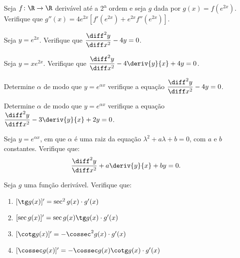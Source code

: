 \begin{exercicio}[9]
Seja $f\colon \R \to \R$ derivável até a 2\textsuperscript{a} ordem e seja $g$ dada por $g(x) = f(e^{2x})$. Verifique que $g''(x) = 4e^{2x}[f'(e^{2x}) + e^{2x}f''(e^{2x})]$.
\end{exercicio}

\begin{exercicio}[10]
Seja $y = e^{2x}$. Verifique que $\dfrac{\diff^2 y}{\diff x^2} - 4y = 0$.
\end{exercicio}

\begin{exercicio}[11]
Seja $y = xe^{2x}$. Verifique que $\dfrac{\diff^2 y}{\diff x^2} - 4\deriv{y}{x} + 4y = 0$.
\end{exercicio}

\begin{exercicio}[12]
Determine $\alpha$ de modo que $y = e^{\alpha x}$ verifique a equação $\dfrac{\diff^2 y}{\diff x^2} - 4y = 0$.
\end{exercicio}

\begin{exercicio}[13]
Determine $\alpha$ de modo que $y = e^{\alpha x}$ verifique a equação $\dfrac{\diff^2 y}{\diff x^2} - 3\deriv{y}{x} + 2y = 0$.
\end{exercicio}

\begin{exercicio}[14]
Seja $y = e^{\alpha x}$, em que $\alpha$ é uma raiz da equação $\lambda^2 + a\lambda + b = 0$, com $a$ e $b$ constantes. Verifique que:
\[
\frac{\diff^2 y}{\diff x^2} + a\deriv{y}{x} + by = 0.
\]
\end{exercicio}

\begin{exercicio}[15]
Seja $g$ uma função derivável. Verifique que:
\begin{enumerate}[label=\alph*)]
    \item $[\tg g(x)]' = \sec^2 g(x) \cdot g'(x)$
    \item $[\sec g(x)]' = \sec g(x)\tg g(x) \cdot g'(x)$
    \item $[\cotg g(x)]' = -\cossec^2 g(x) \cdot g'(x)$
    \item $[\cossec g(x)]' = -\cossec g(x)\cotg g(x) \cdot g'(x)$
\end{enumerate}
\end{exercicio}

